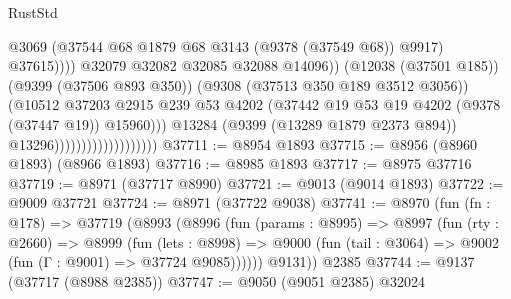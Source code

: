 \begin{lexlean}{RustStd}
\begin{coremodule}
                                                        @3069
                                                        (@37544
                                                          @68
                                                          @1879
                                                          @68
                                                          @3143
                                                          (@9378 (@37549 @68))
                                                          @9917)
                                                        @37615))))
                                                @32079
                                                @32082
                                                @32085
                                                @32088
                                                @14096))
                                            (@12038 (@37501 @185))
                                            (@9399 (@37506 @893 @350))
                                            (@9308 (@37513 @350 @189 @3512 @3056))
                                            (@10512
                                              @37203
                                              @2915
                                              @239
                                              @53
                                              @4202
                                              (@37442
                                                @19
                                                @53
                                                @19
                                                @4202
                                                (@9378 (@37447 @19))
                                                @15960)))
                                          @13284
                                          (@9399 (@13289 @1879 @2373 @894))
                                          @13296)))))))))))))))))))
@37711 := @8954 @1893
@37715 := @8956 (@8960 @1893) (@8966 @1893)
@37716 := @8985 @1893
@37717 := @8975 @37716
@37719 := @8971 (@37717 @8990)
@37721 := @9013 (@9014 @1893)
@37722 := @9009 @37721
@37724 := @8971 (@37722 @9038)
@37741 := @8970
    (fun (fn : @178) =>
    @37719
      (@8993
        (@8996
          (fun (params : @8995) =>
          @8997
            (fun (rty : @2660) =>
            @8999
              (fun (lets : @8998) =>
              @9000 (fun (tail : @3064) => @9002 (fun (Γ : @9001) => @37724 @9085))))))
        @9131))
    @2385
@37744 := @9137 (@37717 (@8988 @2385))
@37747 := @9050 (@9051 @2385) @32024

\end{coremodule}
\end{lexlean}
